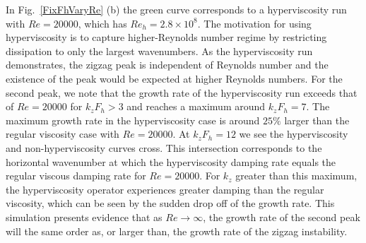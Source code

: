 In Fig.~\ref{FixFhVaryRe} (b) the green curve corresponds to a hyperviscosity run with $Re=20000$, which has $Re_{h}=2.8\times 10^{8}$. The motivation for using hyperviscosity is to capture higher-Reynolds number regime by restricting dissipation to only the largest wavenumbers. As the hyperviscosity run demonstrates, the zigzag peak is independent of Reynolds number and the existence of the peak would be expected at higher Reynolds numbers. For the second peak, we note that the growth rate  of the hyperviscosity run exceeds that of $Re=20000$ for $k_{z}F_{h}>3$ and reaches a maximum around $k_{z}F_{h}=7$. The maximum growth rate in the hyperviscosity case is around $25\%$ larger than the regular viscosity case with $Re=20000$. At $k_{z}F_{h}=12$ we see the hyperviscosity and non-hyperviscosity curves cross. This intersection corresponds to the horizontal wavenumber at which the hyperviscosity damping rate equals the regular viscous damping rate for $Re=20000$. For $k_{z}$ greater than this maximum, the hyperviscosity operator experiences greater damping than the regular viscosity, which can be seen by the sudden drop off of the growth rate. This simulation presents evidence that as $Re\rightarrow \infty$, the growth rate of the second peak will the same order as, or larger than, the growth rate of the zigzag instability. 


